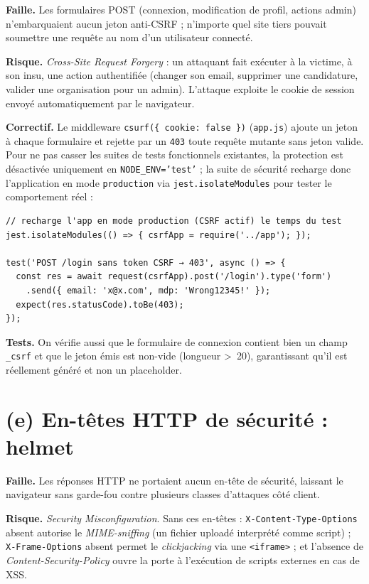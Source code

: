\documentclass[12pt,a4paper]{article}
\begin{document}
\textbf{Faille.} Les formulaires POST (connexion, modification de profil, actions admin) n'embarquaient aucun jeton anti-CSRF ; n'importe quel site tiers pouvait soumettre une requête au nom d'un utilisateur connecté.

\textbf{Risque.} \textit{Cross-Site Request Forgery} : un attaquant fait exécuter à la victime, à son insu, une action authentifiée (changer son email, supprimer une candidature, valider une organisation pour un admin). L'attaque exploite le cookie de session envoyé automatiquement par le navigateur.

\textbf{Correctif.} Le middleware \texttt{csurf(\{ cookie: false \})} (\texttt{app.js}) ajoute un jeton à chaque formulaire et rejette par un \texttt{403} toute requête mutante sans jeton valide. Pour ne pas casser les suites de tests fonctionnels existantes, la protection est désactivée uniquement en \texttt{NODE\_ENV='test'} ; la suite de sécurité recharge donc l'application en mode \texttt{production} via \texttt{jest.isolateModules} pour tester le comportement réel :

\begin{lstlisting}
// recharge l'app en mode production (CSRF actif) le temps du test
jest.isolateModules(() => { csrfApp = require('../app'); });

test('POST /login sans token CSRF → 403', async () => {
  const res = await request(csrfApp).post('/login').type('form')
    .send({ email: 'x@x.com', mdp: 'Wrong12345!' });
  expect(res.statusCode).toBe(403);
});
\end{lstlisting}

\textbf{Tests.} On vérifie aussi que le formulaire de connexion contient bien un champ \texttt{\_csrf} et que le jeton émis est non-vide (longueur \textgreater\ 20), garantissant qu'il est réellement généré et non un placeholder.

\section{(e) En-têtes HTTP de sécurité : helmet}

\textbf{Faille.} Les réponses HTTP ne portaient aucun en-tête de sécurité, laissant le navigateur sans garde-fou contre plusieurs classes d'attaques côté client.

\textbf{Risque.} \textit{Security Misconfiguration}. Sans ces en-têtes : \texttt{X-Content-Type-Options} absent autorise le \textit{MIME-sniffing} (un fichier uploadé interprété comme script) ; \texttt{X-Frame-Options} absent permet le \textit{clickjacking} via une \texttt{<iframe>} ; et l'absence de \textit{Content-Security-Policy} ouvre la porte à l'exécution de scripts externes en cas de XSS.
\end{document}
